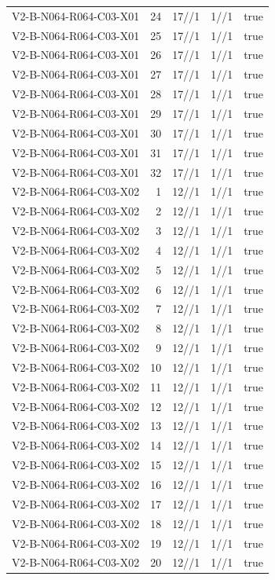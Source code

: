 {\begin{longtable}{lrrrr}
V2-B-N064-R064-C03-X01 & 24 & 17//1 & 1//1 & true \\
V2-B-N064-R064-C03-X01 & 25 & 17//1 & 1//1 & true \\
V2-B-N064-R064-C03-X01 & 26 & 17//1 & 1//1 & true \\
V2-B-N064-R064-C03-X01 & 27 & 17//1 & 1//1 & true \\
V2-B-N064-R064-C03-X01 & 28 & 17//1 & 1//1 & true \\
V2-B-N064-R064-C03-X01 & 29 & 17//1 & 1//1 & true \\
V2-B-N064-R064-C03-X01 & 30 & 17//1 & 1//1 & true \\
V2-B-N064-R064-C03-X01 & 31 & 17//1 & 1//1 & true \\
V2-B-N064-R064-C03-X01 & 32 & 17//1 & 1//1 & true \\
V2-B-N064-R064-C03-X02 & 1 & 12//1 & 1//1 & true \\
V2-B-N064-R064-C03-X02 & 2 & 12//1 & 1//1 & true \\
V2-B-N064-R064-C03-X02 & 3 & 12//1 & 1//1 & true \\
V2-B-N064-R064-C03-X02 & 4 & 12//1 & 1//1 & true \\
V2-B-N064-R064-C03-X02 & 5 & 12//1 & 1//1 & true \\
V2-B-N064-R064-C03-X02 & 6 & 12//1 & 1//1 & true \\
V2-B-N064-R064-C03-X02 & 7 & 12//1 & 1//1 & true \\
V2-B-N064-R064-C03-X02 & 8 & 12//1 & 1//1 & true \\
V2-B-N064-R064-C03-X02 & 9 & 12//1 & 1//1 & true \\
V2-B-N064-R064-C03-X02 & 10 & 12//1 & 1//1 & true \\
V2-B-N064-R064-C03-X02 & 11 & 12//1 & 1//1 & true \\
V2-B-N064-R064-C03-X02 & 12 & 12//1 & 1//1 & true \\
V2-B-N064-R064-C03-X02 & 13 & 12//1 & 1//1 & true \\
V2-B-N064-R064-C03-X02 & 14 & 12//1 & 1//1 & true \\
V2-B-N064-R064-C03-X02 & 15 & 12//1 & 1//1 & true \\
V2-B-N064-R064-C03-X02 & 16 & 12//1 & 1//1 & true \\
V2-B-N064-R064-C03-X02 & 17 & 12//1 & 1//1 & true \\
V2-B-N064-R064-C03-X02 & 18 & 12//1 & 1//1 & true \\
V2-B-N064-R064-C03-X02 & 19 & 12//1 & 1//1 & true \\
V2-B-N064-R064-C03-X02 & 20 & 12//1 & 1//1 & true \\

\end{longtable}}
